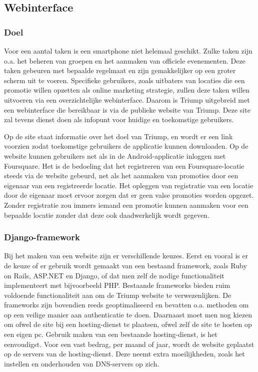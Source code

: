 \subsection{Webinterface}
\label{Webinterface}
\subsubsection{Doel}
Voor een aantal taken is een smartphone niet helemaal geschikt. Zulke taken zijn o.a. het beheren van groepen en het aanmaken van officiele evenementen.
Deze taken gebeuren met bepaalde regelmaat en zijn gemakkelijker op een groter scherm uit te voeren. Specifieke gebruikers, zoals uitbaters van locaties die een promotie willen opzetten als online marketing strategie, zullen deze taken willen uitvoeren via een overzichtelijke webinterface. Daarom is Triump uitgebreid met een webinterface die bereikbaar is via de publieke website van Triump\cite{triumpsite}.
Deze site zal tevens dienst doen als infopunt voor huidige en toekomstige gebruikers. 

Op de site staat informatie over het doel van Triump, en wordt er een link voorzien zodat toekomstige gebruikers de applicatie kunnen downloaden.
Op de website kunnen gebruikers net als in de Android-applicatie inloggen met Foursquare. Het is de bedoeling dat het registreren van een Foursquare-locatie steeds via de website gebeurd, net als het aanmaken van promoties door een eigenaar van een registreerde locatie. Het opleggen van registratie van een locatie door de eigenaar moet ervoor zorgen dat er geen valse promoties worden opgezet. Zonder registratie zou immers iemand een promotie kunnen aanmaken voor een bepaalde locatie zonder dat deze ook daadwerkelijk wordt gegeven.

\subsubsection{Django-framework}
Bij het maken van een website zijn er verschillende keuzes.
Eerst en vooral is er de keuze of er gebruik wordt gemaakt van een bestaand framework, zoals Ruby on Rails, ASP.NET en Django, of dat men zelf de nodige functionaliteit implementeert met bijvoorbeeld PHP.
Bestaande frameworks bieden ruim voldoende functionaliteit aan om de Triump website te verwezenlijken. De frameworks zijn bovendien reeds geoptimaliseerd en bevatten o.a. methoden om op een veilige manier aan authenticatie te doen.
Daarnaast moet men nog kiezen om ofwel de site bij een hosting-dienst te plaatsen, ofwel zelf de site te hosten op een eigen pc. Gebruik maken van een bestaande hosting-dienst, is het eenvoudigst. Voor een vast bedrag, per maand of jaar, wordt de website geplaatst op de servers van de hosting-dienst. Deze neemt extra moeilijkheden, zoals het instellen en onderhouden van DNS-servers op zich.

